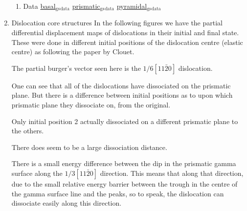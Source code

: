 \documentclass[11pt]{article}
\begin{document}
\begin{enumerate}
\begin{enumerate}
\item Data
\label{sec:org9c6d59a}
\href{file:///home/tigany/Documents/ti/final\_model\_2019-11-12/results\_2019-11-09\_muc/gamma\_surfaces/basal/basal\_gs\_noo\_alat\_energies.dat}{basal\(_{\text{gs}}\)\(_{\text{data}}\)}
\href{file:///home/tigany/Documents/ti/final\_model\_2019-11-12/results\_2019-11-09\_muc/gamma\_surfaces/prismatic/prismatic\_gs\_noo\_alat\_energies.dat}{prismatic\(_{\text{gs}}\)\(_{\text{data}}\)}
\href{file:///home/tigany/Documents/ti/final\_model\_2019-11-12/gamma\_surfaces/pyramidal\_results\_2019-11-13/pyramidal\_gamma\_surface\_2019-11-13.dat}{pyramidal\(_{\text{gs}}\)\(_{\text{data}}\)}
\end{enumerate}
\item Dislocation core structures
\label{sec:org3cc5b53}
In the following figures we have the partial differential
displacement maps of dislocations in their initial and final
state. These were done in different initial positions of the
dislocation centre (elastic centre) as following the paper by
Clouet. 

The partial burger's vector seen here is the \(1/6 [11\bar{2}0]\)
dislocation.

One can see that all of the dislocations have dissociated on the
prismatic plane. But there is a difference between initial
positions as to upon which prismatic plane they dissociate on,
from the original. 

Only initial position 2 actually dissociated on a different
prismatic plane to the others. 


There does seem to be a large dissociation distance. 

There is a small energy difference between the dip in the
prismatic gamma surface along the \(1/3 [11\bar{2}0]\)
direction. This means that along that direction, due to the small
relative energy barrier between the trough in the centre of the
gamma surface line and the peaks, so to speak, the dislocation
can dissociate easily along this direction. 



\end{enumerate}
\end{document}
